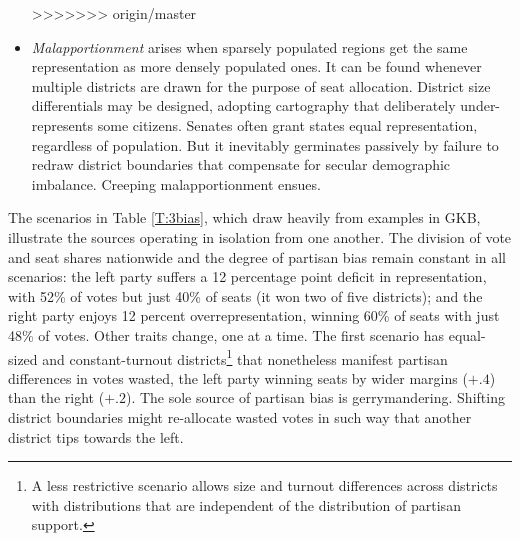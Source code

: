 \documentclass[letter,12pt]{article}
\begin{document}
\begin{itemize}
>>>>>>> origin/master
\item \emph{Malapportionment} arises when sparsely populated regions get the same representation as more densely populated ones. It can be found whenever multiple districts are drawn for the purpose of seat allocation. District size differentials may be designed, adopting cartography that deliberately under-represents some citizens. Senates often grant states equal representation, regardless of population. But it inevitably germinates passively by failure to redraw district boundaries that compensate for secular demographic imbalance. Creeping malapportionment ensues.
\end{itemize} 


The scenarios in Table \ref{T:3bias}, which draw heavily from examples in GKB, illustrate the sources operating in isolation from one another. The division of vote and seat shares nationwide and the degree of partisan bias remain constant in all scenarios: the left party suffers a 12 percentage point deficit in representation, with 52\% of votes but just 40\% of seats (it won two of five districts); and the right party enjoys 12 percent overrepresentation, winning 60\% of seats with just 48\% of votes. Other traits change, one at a time. The first scenario has equal-sized and constant-turnout districts\footnote{A less restrictive scenario allows size and turnout differences across districts with distributions that are independent of the distribution of partisan support.} that nonetheless manifest partisan differences in votes wasted, the left party winning seats by wider margins ($+.4$) than the right ($+.2$). The sole source of partisan bias is gerrymandering. Shifting district boundaries might re-allocate wasted votes in such way that another district tips towards the left. 
\end{document}
